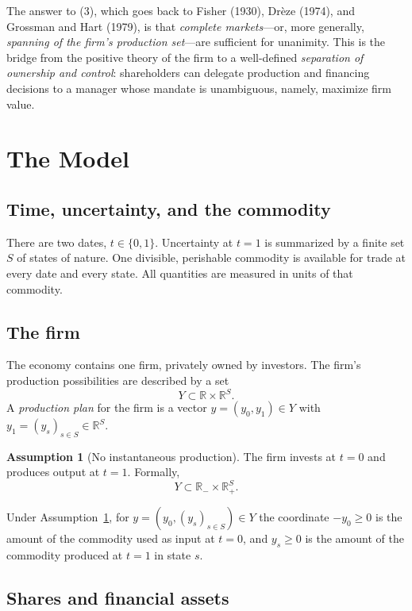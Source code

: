 \documentclass[11pt,a4paper]{article}
\def\R{\mathbb{R}}
\def\geq{\geqslant}
\theoremstyle{plain}
\theoremstyle{definition}
\newtheorem{assumption}[theorem]{Assumption}
\theoremstyle{remark}
\begin{document}
The answer to (3), which goes back to Fisher (1930), Drèze (1974), and Grossman and Hart (1979), is that \emph{complete markets}---or, more generally, \emph{spanning of the firm's production set}---are sufficient for unanimity. This is the bridge from the positive theory of the firm to a well-defined \emph{separation of ownership and control}: shareholders can delegate production and financing decisions to a manager whose mandate is unambiguous, namely, maximize firm value.

\section{The Model}

\subsection{Time, uncertainty, and the commodity}

There are two dates, $t\in\{0,1\}$. Uncertainty at $t=1$ is summarized by a finite set $S$ of states of nature. One divisible, perishable commodity is available for trade at every date and every state. All quantities are measured in units of that commodity.

\subsection{The firm}

The economy contains one firm, privately owned by investors. The firm's production possibilities are described by a set
\[
  Y \subset \R \times \R^{S}.
\]
A \emph{production plan} for the firm is a vector $y=(y_0,y_1)\in Y$ with $y_1=(y_s)_{s\in S}\in\R^S$.

\begin{assumption}[No instantaneous production]\label{ass:no-instant}
The firm invests at $t=0$ and produces output at $t=1$. Formally,
\[
  Y \subset \R_{-} \times \R^{S}_{+}.
\]
\end{assumption}

Under Assumption~\ref{ass:no-instant}, for $y=(y_0,(y_s)_{s\in S}) \in Y$ the coordinate $-y_0\geq 0$ is the amount of the commodity used as input at $t=0$, and $y_s\geq 0$ is the amount of the commodity produced at $t=1$ in state $s$.

\subsection{Shares and financial assets}
\end{document}
